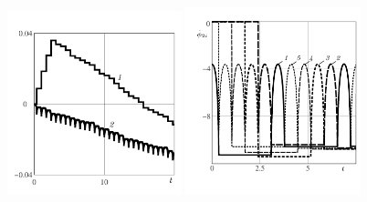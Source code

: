 \begin{figure}[H]
  \includegraphics[width=0.45\textwidth]{pic/figure6_1.pdf}
  \includegraphics[width=0.45\textwidth]{pic/figure6_2.pdf}
  \caption{\ }
  \label{fig:straight}
\end{figure}

